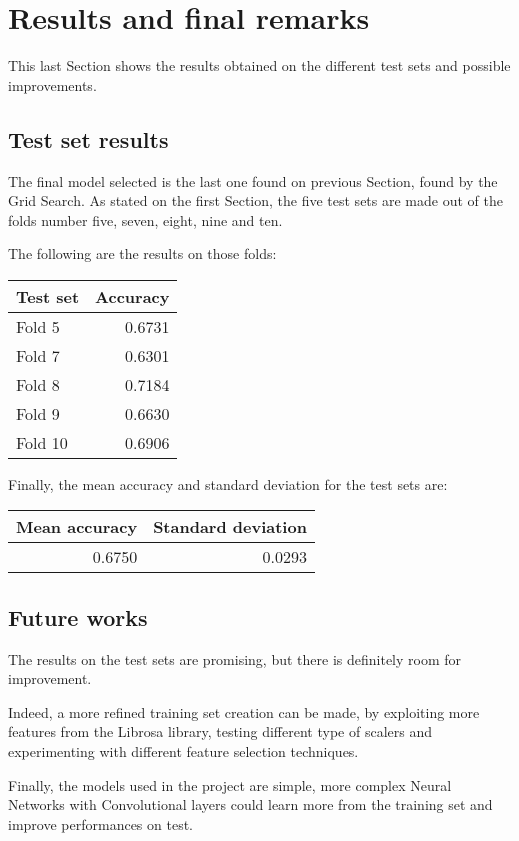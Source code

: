 \section{Results and final remarks}
\label{results}

This last Section shows the results obtained on the different 
test sets and possible improvements.

\subsection{Test set results}
The final model selected is the last one found on previous Section, 
found by the Grid Search.
As stated on the first Section, the five test sets are made out of the 
folds number five, seven, eight, nine and ten. 

The following are the results on those folds:

\begin{center}
    \begin{tabular}{ |l|r| } 
        \hline
        Test set & Accuracy\\
        \hline
        Fold 5 & 0.6731 \\
        Fold 7 & 0.6301 \\
        Fold 8 & 0.7184 \\
        Fold 9 & 0.6630 \\
        Fold 10 & 0.6906 \\ 
        \hline
    \end{tabular}
\end{center}

Finally, the mean accuracy and standard deviation for the test sets are: 
\begin{center}
    \begin{tabular}{ |r|r| } 
        \hline
        Mean accuracy & Standard deviation\\
        \hline
        0.6750 & 0.0293 \\
        \hline
    \end{tabular}
\end{center}

\subsection{Future works}

The results on the test sets are promising, but there is definitely 
room for improvement.

Indeed, a more refined training set creation can be made, by exploiting 
more features from the Librosa library, testing different type 
of scalers and experimenting with different feature selection 
techniques.

Finally, the models used in the project are simple, more complex 
Neural Networks with Convolutional layers could learn more from the 
training set and improve performances on test.